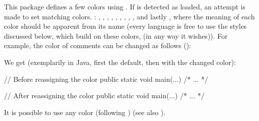 \documentclass{sopra-base}
\begin{document}
    This package defines a few colors using . If  is detected as loaded, an attempt is made to set matching colors. : , , , , , , , , ,  and lastly , where the meaning of each color should be apparent from its name (every language is free to use the styles discussed below, which
    build on these colors, (in any way it wishes)). For example, the color
    of comments can be changed as follows ():
\begin{plainlatex}[morekeywords={[2]{\\lstcolorlet}}]
\end{plainlatex}
    We get (exemplarily in Java, first the default, then with the changed color):
    \begingroup
\begin{java}
// Before reassigning the color
public static void main(...){ /* ... */ }
\end{java}
\begin{java}
// After reassigning the color
public static void main(...){ /* ... */ }
    \end{java}
    \endgroup
 It is possible to use any color (following ) (see also ).
\end{document}
